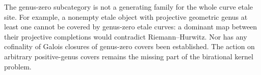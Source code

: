 The genus-zero subcategory is not a generating family
for the whole curve etale site. For example, a nonempty
etale object with projective geometric genus at least
one cannot be covered by genus-zero etale curves: a
dominant map between their projective completions would
contradict Riemann--Hurwitz. Nor has any cofinality of
Galois closures of genus-zero covers been established.
The action on arbitrary positive-genus covers remains the missing
part of the birational kernel problem.
